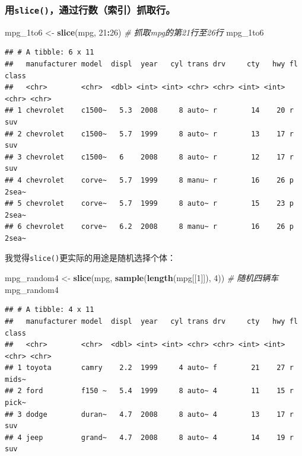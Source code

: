 \documentclass[]{book}
\newenvironment{Shaded}{\begin{snugshade}}{\end{snugshade}}
\newcommand{\CommentTok}[1]{\textcolor[rgb]{0.56,0.35,0.01}{\textit{#1}}}
\newcommand{\DecValTok}[1]{\textcolor[rgb]{0.00,0.00,0.81}{#1}}
\newcommand{\KeywordTok}[1]{\textcolor[rgb]{0.13,0.29,0.53}{\textbf{#1}}}
\newcommand{\NormalTok}[1]{#1}
\newcommand{\OperatorTok}[1]{\textcolor[rgb]{0.81,0.36,0.00}{\textbf{#1}}}
\newcommand{\StringTok}[1]{\textcolor[rgb]{0.31,0.60,0.02}{#1}}
\begin{document}
\hypertarget{slice}{%
\subsubsection{\texorpdfstring{用\texttt{slice()}，通过行数（索引）抓取行。}{用slice()，通过行数（索引）抓取行。}}\label{slice}}

\begin{Shaded}
\begin{Highlighting}[]
\NormalTok{mpg_1to6 <-}\StringTok{ }\KeywordTok{slice}\NormalTok{(mpg, }\DecValTok{21}\OperatorTok{:}\DecValTok{26}\NormalTok{) }\CommentTok{# 抓取mpg的第21行至26行}
\NormalTok{mpg_1to6}
\end{Highlighting}
\end{Shaded}

\begin{verbatim}
## # A tibble: 6 x 11
##   manufacturer model  displ  year   cyl trans drv     cty   hwy fl    class
##   <chr>        <chr>  <dbl> <int> <int> <chr> <chr> <int> <int> <chr> <chr>
## 1 chevrolet    c1500~   5.3  2008     8 auto~ r        14    20 r     suv  
## 2 chevrolet    c1500~   5.7  1999     8 auto~ r        13    17 r     suv  
## 3 chevrolet    c1500~   6    2008     8 auto~ r        12    17 r     suv  
## 4 chevrolet    corve~   5.7  1999     8 manu~ r        16    26 p     2sea~
## 5 chevrolet    corve~   5.7  1999     8 auto~ r        15    23 p     2sea~
## 6 chevrolet    corve~   6.2  2008     8 manu~ r        16    26 p     2sea~
\end{verbatim}

我觉得\texttt{slice()}更实际的用途是随机选择个体：

\begin{Shaded}
\begin{Highlighting}[]
\NormalTok{mpg_random4 <-}\StringTok{ }\KeywordTok{slice}\NormalTok{(mpg, }\KeywordTok{sample}\NormalTok{(}\KeywordTok{length}\NormalTok{(mpg[[}\DecValTok{1}\NormalTok{]]), }\DecValTok{4}\NormalTok{)) }\CommentTok{# 随机四辆车}
\NormalTok{mpg_random4}
\end{Highlighting}
\end{Shaded}

\begin{verbatim}
## # A tibble: 4 x 11
##   manufacturer model  displ  year   cyl trans drv     cty   hwy fl    class
##   <chr>        <chr>  <dbl> <int> <int> <chr> <chr> <int> <int> <chr> <chr>
## 1 toyota       camry    2.2  1999     4 auto~ f        21    27 r     mids~
## 2 ford         f150 ~   5.4  1999     8 auto~ 4        11    15 r     pick~
## 3 dodge        duran~   4.7  2008     8 auto~ 4        13    17 r     suv  
## 4 jeep         grand~   4.7  2008     8 auto~ 4        14    19 r     suv
\end{verbatim}
\end{document}
